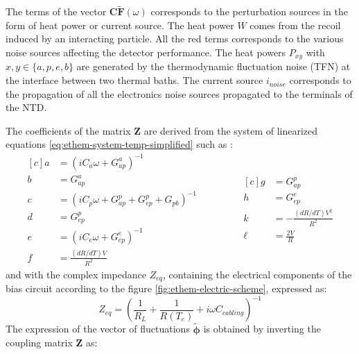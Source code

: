 The terms of the vector $\bm{C} \bm{\tilde{F}} (\omega)$ corresponds to the perturbation sources in the form of heat power or current source. The heat power $W$ comes from the recoil induced by an interacting particle.
All the red terms corresponds to the various noise sources affecting the detector performance. The heat powers $P_{xy}$ with $x,y \in \{ a,p,e,b \}$ are generated by the thermodynamic fluctuation noise (TFN) at the interface between two thermal baths. The current source $i_{noise}$ corresponds to the propagation of all the electronics noise sources propagated to the terminals of the NTD.

The coefficients of the matrix $\bm{Z}$ are derived from the system of linearized equations \ref{eq:ethem-system-temp-simplified} such as :
\begin{equation}
\begin{aligned}[c]
a &=(i C_a \omega + G_{ap}^a)^{-1} \\
b &=G_{ap}^a \\
c &=(i C_p \omega + G_{ap}^p + G_{ep}^p + G_{pb})^{-1} \\
d &=G_{ep}^p \\
e &=(i C_e \omega + G_{ep}^e)^{-1}\\
f &=\frac{(dR/dT) V}{R^2} 
\end{aligned}
\qquad \qquad
\begin{aligned}[c]
g &=G_{ap}^p \\
h &=G_{ep}^e \\
k &=- \frac{(dR/dT) V^{2}}{R^{2}} \\
\ell &=\frac{2 V}{R}
\end{aligned}
\label{coef}
\end{equation}
and with the complex impedance $Z_{eq}$, containing the electrical components of the bias circuit according to the figure \ref{fig:ethem-electric-scheme}, expressed as:
\begin{equation}
Z_{eq} = \left(\frac{1}{R_L} + \frac{1}{R(T_e)} + i\omega C_{cabling}\right)^{-1}
\end{equation}
The expression of the vector of fluctuations $\bm{\tilde{\phi}}$ is obtained by inverting the coupling matrix $\bm{Z}$ as:
